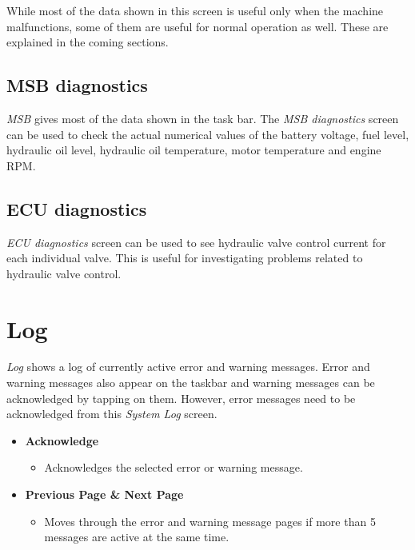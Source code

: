 \documentclass[12pt,a4paper,english]{uvmanual}
\begin{document}

While most of the data shown in this screen is useful only when the machine malfunctions, some of them are useful for normal operation as well. These are explained in the coming sections.

\FloatBarrier
\subsection{MSB diagnostics}\label{ch:system_diagnostics_msb}


\textit{MSB} gives most of the data shown in the task bar. The \textit{MSB diagnostics} screen can be used to check the actual numerical values of the battery voltage, fuel level, hydraulic oil level, hydraulic oil temperature, motor temperature and engine RPM.

\FloatBarrier
\subsection{ECU diagnostics}\label{ch:system_diagnostics_ecu}


\textit{ECU diagnostics} screen can be used to see hydraulic valve control current for each individual valve. This is useful for investigating problems related to hydraulic valve control.

\section{Log}\label{ch:system_log}

\textit{Log} shows a log of currently active error and warning messages. Error and warning messages also appear on the taskbar and warning messages can be acknowledged by tapping on them. However, error messages need to be acknowledged from this \textit{System Log} screen. 


\begin{itemize}
 \item \textbf{Acknowledge}
 \begin{itemize}
  \item Acknowledges the selected error or warning message.
 \end{itemize}

 \item \textbf{Previous Page \& Next Page}
 \begin{itemize}
  \item Moves through the error and warning message pages if more than 5 messages are active at the same time.
 \end{itemize}

\end{itemize}
\end{document}
